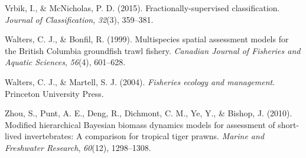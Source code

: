 \documentclass[12pt,]{scrartcl}
\begin{document}
\hypertarget{ref-vrbik2015fractionally}{}
Vrbik, I., \& McNicholas, P. D. (2015). Fractionally-supervised
classification. \emph{Journal of Classification}, \emph{32}(3),
359--381.

\hypertarget{ref-walters1999multispecies}{}
Walters, C. J., \& Bonfil, R. (1999). Multispecies spatial assessment
models for the British Columbia groundfish trawl fishery. \emph{Canadian
Journal of Fisheries and Aquatic Sciences}, \emph{56}(4), 601--628.

\hypertarget{ref-walters2004fisheries}{}
Walters, C. J., \& Martell, S. J. (2004). \emph{Fisheries ecology and
management}. Princeton University Press.

\hypertarget{ref-zhou2010modified}{}
Zhou, S., Punt, A. E., Deng, R., Dichmont, C. M., Ye, Y., \& Bishop, J.
(2010). Modified hierarchical Bayesian biomass dynamics models for
assessment of short-lived invertebrates: A comparison for tropical tiger
prawns. \emph{Marine and Freshwater Research}, \emph{60}(12),
1298--1308.
\end{document}
